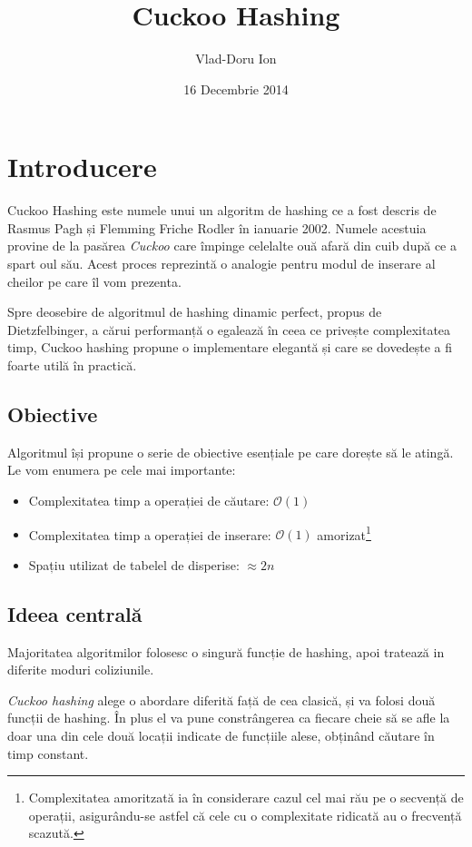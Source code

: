 \documentclass[a4paper]{article}
\title{\textbf{Cuckoo Hashing}}
\author{Vlad-Doru Ion}
\date{16 Decembrie 2014}
\affil{Facultatea de Matematica si Informatica \\ Universitatea din Bucuresti}
\theoremstyle{remark}
\theoremstyle{definition}
\begin{document}
\maketitle

\section{Introducere}

Cuckoo Hashing este numele unui un algoritm de hashing ce a fost descris de Rasmus Pagh și Flemming Friche Rodler în ianuarie 2002. Numele acestuia provine de la pasărea \textit{Cuckoo} care împinge celelalte ouă afară din cuib după ce a spart oul său. Acest proces reprezintă o analogie pentru modul de inserare al cheilor pe care îl vom prezenta.

Spre deosebire de algoritmul de hashing dinamic perfect, propus de Dietzfelbinger, a cărui performanță o egalează în ceea ce privește complexitatea timp, Cuckoo hashing propune o implementare elegantă și care se dovedește a fi foarte utilă în practică.

\subsection {Obiective}

Algoritmul își propune o serie de obiective esențiale pe care dorește să le atingă. Le vom enumera pe cele mai importante:
\begin{itemize}
\item Complexitatea timp a operației de căutare: $\mathcal{O}(1)$
\item Complexitatea timp a operației de inserare: $\mathcal{O}(1)$ amorizat\footnote{Complexitatea amoritzată ia în considerare cazul cel mai rău pe o secvență de operații, asigurându-se astfel că cele cu o complexitate ridicată au o frecvență scazută.}
\item Spațiu utilizat de tabelel de disperise: $\approx 2n$
\end{itemize}

\subsection {Ideea centrală}

Majoritatea algoritmilor folosesc o singură funcție de hashing, apoi tratează in diferite moduri coliziunile.

\textit{Cuckoo hashing} alege o abordare diferită față de cea clasică, și va folosi două funcții de hashing. În plus el va pune constrângerea ca fiecare cheie să se afle la doar una din cele două locații indicate de funcțiile alese, obținând căutare în timp constant. 
\end{document}
